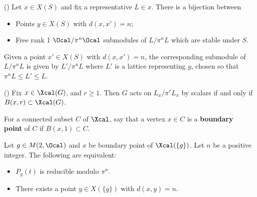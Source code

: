  \begin{lemma}(\cite[Lemma 2.2]{ophirRIBETLEMMAGL22021})
 Let $x \in X(S)$ and fix a representative $L \in x$. There is a bijection between
 \begin{itemize}
	 \item Points $y \in X(S)$ with $d(x,x') = n$;
	 \item Free rank 1 $\Ocal/ \pi^n \Ocal$ submodules of $L/\pi^n L$ which are stable under $S$.
 \end{itemize}
 Given a point $x' \in X(S)$ with $d(x,x')=n$, the corresponding submodule of $L/\pi^n L$ is given by $L'/\pi^n L$ where $L'$ is a lattice representing $y$, chosen so that $ \pi^n L \leq L' \leq L$.
 \end{lemma}

 \begin{lemma}(\cite[Lemma 2.6]{ophirRIBETLEMMAGL22021})
 Fix $x\in \Xcal(G)$, and $r\geq 1$. Then $G$ acts on $L_x / \pi^r L_x$ by scalars if and only if $B(x,r) \subset \Xcal(G)$.
 \end{lemma}


 \begin{definition}
 For a connected subset $C$ of $\Xcal$, say that a vertex $x \in C$ is a \textbf{boundary point} of $C$ if $B(x,1) \subset C$.
 \end{definition}



 \begin{lemma}\label{lemma:elementwise}
 \cite[Cor. 2.20]{ophirRIBETLEMMAGL22021} Let $g\in M(2,\Ocal)$ and $x$ be boundary point of $\Xcal(\{g\})$. Let $n$ be a positive integer. The following are equivalent:
 \begin{itemize}
	 \item $P_g(t)$ is reducible modulo $\pi^n$.
	 \item There exists a point $y \in X(\{g\})$ with $d(x,y) = n$.
 \end{itemize}
 \end{lemma}




